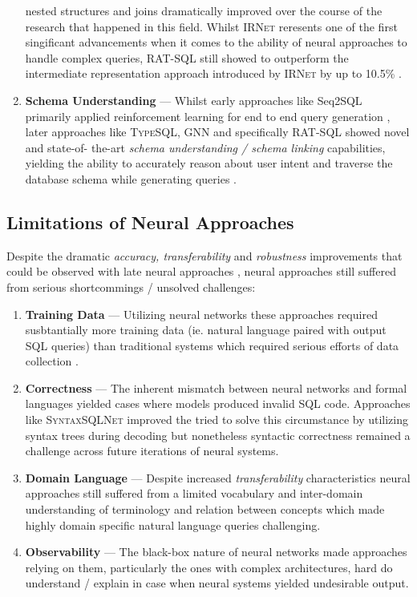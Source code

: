 \documentclass{article}
\begin{document}
\begin{enumerate}
          nested structures and joins dramatically improved over the course of the research that happened in this field. Whilst 
          \textsc{IRNet} reresents one of the first singificant advancements when it comes to the ability of neural approaches to handle
          complex queries, \textsc{RAT-SQL} still showed to outperform the intermediate representation approach introduced by \textsc{IRNet}
          by up to 10.5\% \citep{IRNet, RATSQL}.
    \item \textbf{Schema Understanding} — Whilst early approaches like Seq2SQL primarily applied reinforcement learning for end to end
          query generation \citep{Seq2SQL}, later approaches like \textsc{TypeSQL, GNN} and specifically \textsc{RAT-SQL} showed novel and state-of-
          the-art \textit{schema understanding / schema linking} capabilities, yielding the ability to accurately reason about user intent and
          traverse the database schema while generating queries \citep{TypeSQL, GNN, RATSQL}. 
\end{enumerate}

\subsection{Limitations of Neural Approaches}

Despite the dramatic \textit{accuracy, transferability} and \textit{robustness} improvements that could be observed with late neural
approaches \citep{IRNet, RATSQL}, neural approaches still suffered from serious shortcommings / unsolved challenges:

\begin{enumerate}
    \item \textbf{Training Data} — Utilizing neural networks these approaches required susbtantially more training data (ie. natural language
          paired with output SQL queries) than traditional systems which required serious efforts of data collection \citep{Spider}.
    \item \textbf{Correctness} — The inherent mismatch between neural networks and formal languages yielded cases where models produced
          invalid SQL code. Approaches like \textsc{SyntaxSQLNet} improved the tried to solve this circumstance by utilizing syntax trees
          during decoding but nonetheless syntactic correctness remained a challenge across future iterations of neural systems. \citep{SyntaxSQLNet}
    \item \textbf{Domain Language} — Despite increased \textit{transferability} characteristics neural approaches still suffered from a
          limited vocabulary and inter-domain understanding of terminology and relation between concepts which made highly domain
          specific natural language queries challenging.
    \item \textbf{Observability} — The black-box nature of neural networks made approaches relying on them, particularly the ones with complex
          architectures, hard do understand / explain in case when neural systems yielded undesirable output. 
\end{enumerate}
\end{document}
